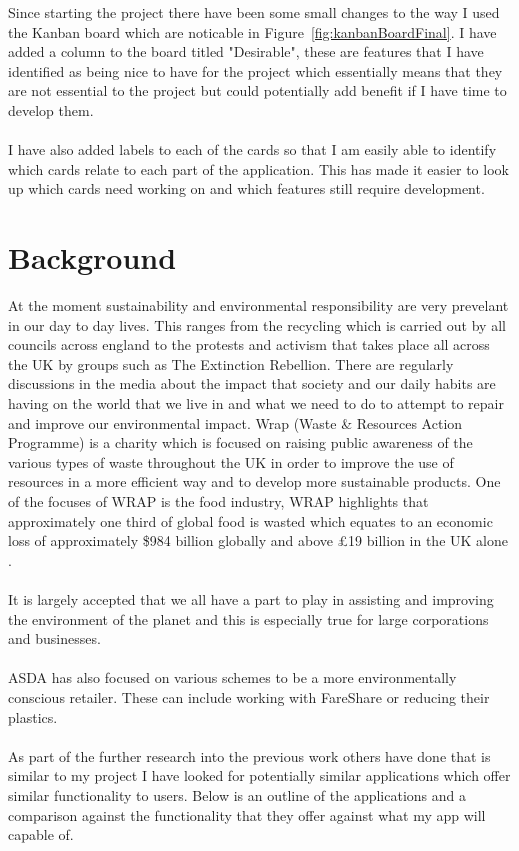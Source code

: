 \documentclass[a4paper,11pt]{report}
\begin{document}
Since starting the project there have been some small changes to the way I used the Kanban board which are noticable in Figure~\ref{fig:kanbanBoardFinal}.
I have added a column to the board titled "Desirable", these are features that I have identified as being nice to have for the
project which essentially means that they are not essential to the project but could potentially add benefit if I have time to develop them.
\\
\\
I have also added labels to each of the cards so that I am easily able to identify which cards relate to each part of the application.
This has made it easier to look up which cards need working on and which features still require development. 


\chapter{Background}

At the moment sustainability and environmental responsibility are very prevelant in our day
to day lives. This ranges from the recycling which is carried out by all councils across
england to the protests and activism that takes place all across the UK by groups such 
as The Extinction Rebellion. There are regularly discussions in the media about the impact
that society and our daily habits are having on the world that we live in and what we need
to do to attempt to repair and improve our environmental impact. Wrap (Waste \& Resources Action Programme) \cite{wrapvision}
is a charity which is focused on raising public awareness of the various types of waste throughout the UK
in order to improve the use of resources in a more efficient way and to develop more sustainable products.
One of the focuses of WRAP is the food industry, WRAP highlights that approximately one third of global food
is wasted which equates to an economic loss of approximately \$984 billion globally and above £19 billion in the UK alone \cite{wrap-food-drink}.
\\
\\
It is largely accepted that we all have a part to play in assisting and improving the environment
of the planet and this is especially true for large corporations and businesses. 
\\
\\
ASDA has also focused on various schemes to be a more environmentally conscious retailer. 
These can include working with FareShare \cite{asda-food-waste} or reducing their plastics. 
\\ 
\\  
As part of the further research into the previous work others have done that is similar to my project 
I have looked for potentially similar applications which offer similar functionality to users. 
Below is an outline of the applications and a comparison against the functionality that they
offer against what my app will capable of.
\end{document}
